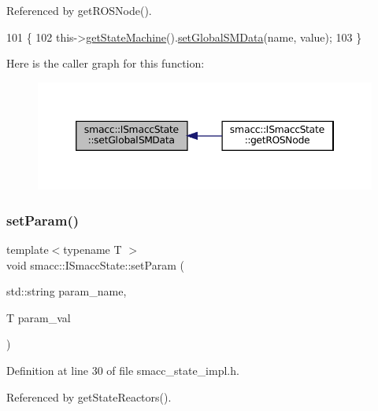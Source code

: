 Referenced by get\+R\+O\+S\+Node().


\begin{DoxyCode}
101 \{
102     this->\hyperlink{classsmacc_1_1ISmaccState_a562bb3f9a3ac16b8be71e4794c9e7523}{getStateMachine}().\hyperlink{classsmacc_1_1ISmaccStateMachine_a8588f9e580fbb95b53e2bd2ca3ff1f98}{setGlobalSMData}(name, value);
103 \}
\end{DoxyCode}
Here is the caller graph for this function\+:
\nopagebreak
\begin{figure}[H]
\begin{center}
\leavevmode
\includegraphics[width=346pt]{classsmacc_1_1ISmaccState_a120fcda41b44a437ff2e3906ac9fa5ca_icgraph}
\end{center}
\end{figure}
\mbox{\label{classsmacc_1_1ISmaccState_a0b6c531ca8c446052022308548f55b92}} 
\subsubsection{\texorpdfstring{set\+Param()}{setParam()}}
{\footnotesize\ttfamily template$<$typename T $>$ \\
void smacc\+::\+I\+Smacc\+State\+::set\+Param (\begin{DoxyParamCaption}\item[{std\+::string}]{param\+\_\+name,  }\item[{T}]{param\+\_\+val }\end{DoxyParamCaption})}



Definition at line 30 of file smacc\+\_\+state\+\_\+impl.\+h.



Referenced by get\+State\+Reactors().



